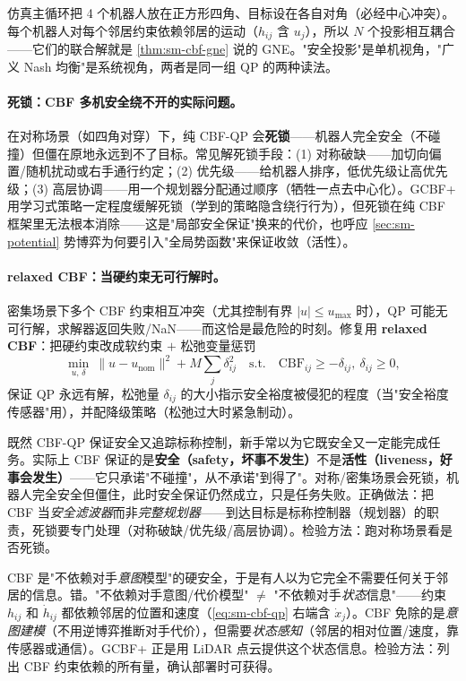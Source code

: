 仿真主循环把 4 个机器人放在正方形四角、目标设在各自对角（必经中心冲突）。每个机器人对每个邻居约束依赖邻居的运动（$h_{ij}$ 含 $u_j$），所以 $N$ 个投影相互耦合——它们的联合解就是 \cref{thm:sm-cbf-gne} 说的 GNE。"安全投影"是单机视角，"广义 Nash 均衡"是系统视角，两者是同一组 QP 的两种读法。

\paragraph{死锁：CBF 多机安全绕不开的实际问题。}
在对称场景（如四角对穿）下，纯 CBF-QP 会\textbf{死锁}——机器人完全安全（不碰撞）但僵在原地永远到不了目标。常见解死锁手段：(1) 对称破缺——加切向偏置/随机扰动或右手通行约定；(2) 优先级——给机器人排序，低优先级让高优先级；(3) 高层协调——用一个规划器分配通过顺序（牺牲一点去中心化）。GCBF+ 用学习式策略一定程度缓解死锁（学到的策略隐含绕行行为），但死锁在纯 CBF 框架里无法根本消除——这是"局部安全保证"换来的代价，也呼应 \cref{sec:sm-potential} 势博弈为何要引入"全局势函数"来保证收敛（活性）。

\paragraph{relaxed CBF：当硬约束无可行解时。}
密集场景下多个 CBF 约束相互冲突（尤其控制有界 $|u|\le u_{\max}$ 时），QP 可能无可行解，求解器返回失败/NaN——而这恰是最危险的时刻。修复用 \textbf{relaxed CBF}：把硬约束改成软约束 $+$ 松弛变量惩罚
\begin{equation}
  \min_{u,\,\delta}\ \|u-u_{\text{nom}}\|^2+M\sum_j\delta_{ij}^2
  \quad\text{s.t.}\quad \text{CBF}_{ij}\ge-\delta_{ij},\ \delta_{ij}\ge0,
  \label{eq:sm-relaxed-cbf}
\end{equation}
保证 QP 永远有解，松弛量 $\delta_{ij}$ 的大小指示安全裕度被侵犯的程度（当"安全裕度传感器"用），并配降级策略（松弛过大时紧急制动）。

\begin{pitfall}
既然 CBF-QP 保证安全又追踪标称控制，新手常以为它既安全又一定能完成任务。实际上 CBF 保证的是\textbf{安全（safety，坏事不发生）}不是\textbf{活性（liveness，好事会发生）}——它只承诺"不碰撞"，从不承诺"到得了"。对称/密集场景会死锁，机器人完全安全但僵住，此时安全保证仍然成立，只是任务失败。正确做法：把 CBF 当\emph{安全滤波器}而非\emph{完整规划器}——到达目标是标称控制器（规划器）的职责，死锁要专门处理（对称破缺/优先级/高层协调）。检验方法：跑对称场景看是否死锁。
\end{pitfall}

\begin{pitfall}
CBF 是"不依赖对手\emph{意图}模型"的硬安全，于是有人以为它完全不需要任何关于邻居的信息。错。"不依赖对手意图/代价模型" $\neq$ "不依赖对手\emph{状态}信息"——约束 $h_{ij}$ 和 $\dot h_{ij}$ 都依赖邻居的位置和速度（\cref{eq:sm-cbf-qp} 右端含 $\dot x_j$）。CBF 免除的是\emph{意图建模}（不用逆博弈推断对手代价），但需要\emph{状态感知}（邻居的相对位置/速度，靠传感器或通信）。GCBF+ 正是用 LiDAR 点云提供这个状态信息。检验方法：列出 CBF 约束依赖的所有量，确认部署时可获得。
\end{pitfall}

